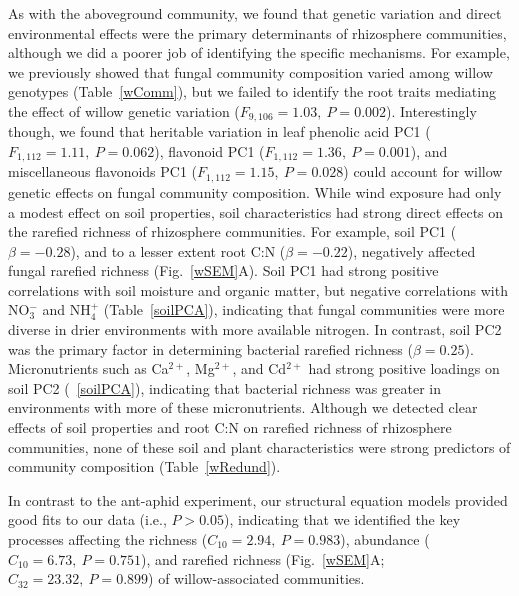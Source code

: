 \documentclass[11pt]{article}
\begin{document}
As with the aboveground community, we found that genetic
variation and direct environmental effects were the primary determinants
of rhizosphere communities, although we did a poorer job of identifying
the specific mechanisms. For example, we previously showed that fungal
community composition varied among willow genotypes (Table~\ref{wComm}), but we
failed to identify the root traits mediating the effect of willow
genetic variation (\(F_{9,106}=1.03,\ P=0.002\)). Interestingly though, we found that heritable variation in leaf phenolic acid PC1 (\(F_{1,112} = 1.11,\ P=0.062\)), flavonoid PC1 (\(F_{1,112} = 1.36,\ P=0.001\)), and miscellaneous flavonoids PC1 (\(F_{1,112} = 1.15,\ P=0.028\)) could account for willow genetic effects on fungal community composition.
While wind exposure had only a modest effect on soil
properties, soil characteristics had strong direct effects on the
rarefied richness of rhizosphere communities. For example, soil PC1
($\beta = -0.28$), and to a lesser extent root C:N ($\beta =
-0.22$), negatively affected fungal rarefied richness (Fig.~\ref{wSEM}A). Soil PC1
had strong positive correlations with soil moisture and organic matter,
but negative correlations with NO$_3^-$ and NH$_4^+$ (Table~\ref{soilPCA}), indicating that
fungal communities were more diverse in drier environments with more
available nitrogen. In contrast, soil PC2 was the primary factor in
determining bacterial rarefied richness ($\beta = 0.25$).
Micronutrients such as Ca$^{2+}$, Mg$^{2+}$, and Cd$^{2+}$ had strong positive loadings
on soil PC2 (~\ref{soilPCA}), indicating that bacterial richness was greater in
environments with more of these micronutrients. 
Although we detected
clear effects of soil properties and root C:N on rarefied richness of
rhizosphere communities, none of these soil and plant
characteristics were strong predictors of community
composition (Table~\ref{wRedund}).

In contrast to the ant-aphid experiment, our structural equation models
provided good fits to our data (i.e., \(P>0.05\)), indicating
that we identified the key processes affecting the richness (\(C_{10}=2.94,\ P=0.983\)), abundance (\(C_{10}=6.73,\ P=0.751\)), and rarefied richness
(Fig.~\ref{wSEM}A; \(C_{32}=23.32,\ P=0.899\)) of willow-associated communities.
\end{document}

